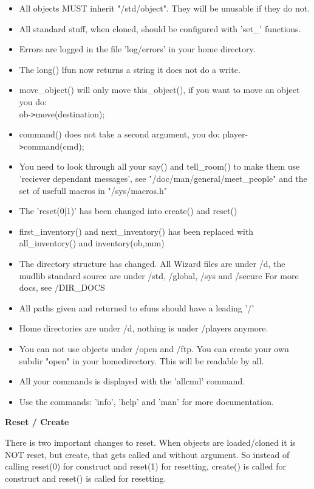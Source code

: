 \begin{itemize}
\item  All objects MUST inherit "/std/object". They will be unusable if they do not.
\item All standard stuff, when cloned, should be configured with 'set\_' functions.
\item Errors are logged in the file 'log/errors' in your home directory.
\item The long() lfun now returns a string it does not do a write.
\item move\_object() will only move this\_object(), if you want to move an object
      you do: \\ ob-\verb+>+move(destination);
\item command() does not take a second argument, you do: player-\verb+>+command(cmd);
\item You need to look through all your say() and tell\_room() to make them use
      'reciever dependant messages', see "/doc/man/general/meet\_people" and the set
      of usefull macros in "/sys/macros.h"
\item The 'reset(0|1)' has been changed into create() and reset()
\item first\_inventory() and next\_inventory() has been replaced with
      all\_inventory() and inventory(ob,num)

\item The directory structure has changed. All Wizard files are under /d,
      the mudlib standard source are under /std, /global, /sys and /secure
      For more docs, see /DIR\_DOCS
\item All paths given and returned to efuns should have a leading '/'
\item Home directories are under /d, nothing is under /players anymore.
\item You can not use objects under /open and /ftp. You can create your own subdir
      "open" in your homedirectory. This will be readable by all.

\item All your commands is displayed with the 'allcmd' command.
\item Use the commands: 'info', 'help' and 'man' for more documentation.
\end{itemize}

{\bf Reset / Create}

There is two important changes to reset. When objects are loaded/cloned it
is NOT reset, but create, that gets called and without argument. So instead of
calling reset(0) for construct and reset(1) for resetting, create() is called
for construct and reset() is called for resetting.

